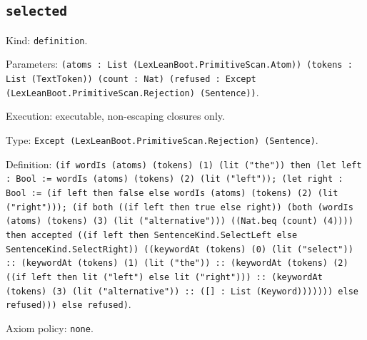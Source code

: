 \documentclass[11pt]{article}
\begin{document}
\subsection*{\texttt{selected}}
\noindent Kind: \texttt{definition}.\par
\noindent Parameters: \texttt{(atoms : List (LexLeanBoot.PrimitiveScan.Atom)) (tokens : List (TextToken)) (count : Nat) (refused : Except (LexLeanBoot.PrimitiveScan.Rejection) (Sentence))}.\par
\noindent Execution: executable, non-escaping closures only.\par
\noindent Type: \texttt{Except (LexLeanBoot.PrimitiveScan.Rejection) (Sentence)}.\par
\noindent Definition: \texttt{(if wordIs (atoms) (tokens) (1) (lit ("the")) then (let left : Bool := wordIs (atoms) (tokens) (2) (lit ("left")); (let right : Bool := (if left then false else wordIs (atoms) (tokens) (2) (lit ("right"))); (if both ((if left then true else right)) (both (wordIs (atoms) (tokens) (3) (lit ("alternative"))) ((Nat.beq (count) (4)))) then accepted ((if left then SentenceKind.SelectLeft else SentenceKind.SelectRight)) ((keywordAt (tokens) (0) (lit ("select")) :: (keywordAt (tokens) (1) (lit ("the")) :: (keywordAt (tokens) (2) ((if left then lit ("left") else lit ("right"))) :: (keywordAt (tokens) (3) (lit ("alternative")) :: ([] : List (Keyword))))))) else refused))) else refused)}.\par
\noindent Axiom policy: \texttt{none}.\par
\end{document}
